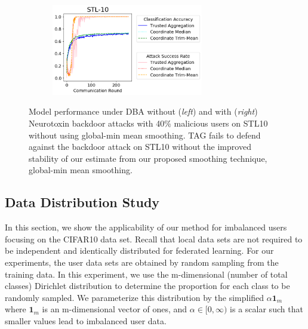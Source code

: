\documentclass{article} %
\begin{document}
\begin{figure}[htp]
\centering
  \begin{subfigure}{.35\textwidth}
  \end{subfigure}%
  ~
  \begin{subfigure}{.65\textwidth}
    \includegraphics[height=4cm, left]{make_article/make_visuals/visuals/accuracy--stl_10--n_malicious4--dba1--beta0.2--neuro_p0.1--no_smooth.png}
  \end{subfigure}
\caption{\footnotesize Model performance under DBA without (\textit{left}) and with (\textit{right}) Neurotoxin backdoor attacks with 40\% malicious users on STL10 without using global-min mean smoothing. TAG fails to defend against the backdoor attack on STL10 without the improved stability of our estimate from our proposed smoothing technique, global-min mean smoothing.}
\label{fig: accuracy--n_malicious4--no_smooth}
\end{figure}


%
\subsection{Data Distribution Study}

In this section, we show the applicability of our method for imbalanced users focusing on the CIFAR10 data set. Recall that local data sets are not required to be independent and identically distributed for federated learning. For our experiments, the user data sets are obtained by random sampling from the training data. In this experiment, we use the m-dimensional (number of total classes) Dirichlet distribution to determine the proportion for each class to be randomly sampled. We parameterize this distribution by the simplified $\alpha \mathbf{1}_m$ where $\mathbf{1}_m$ is an m-dimensional vector of ones, and $\alpha \in [0, \infty)$ is a scalar such that smaller values lead to imbalanced user data.
\end{document}

